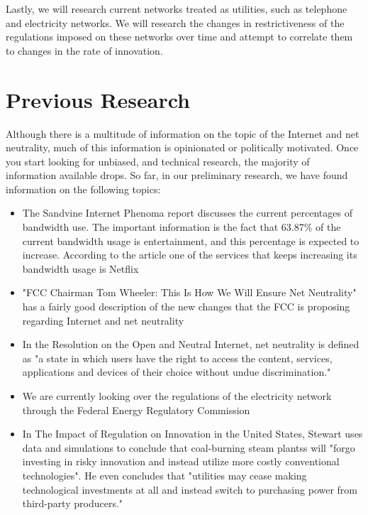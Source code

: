 \documentclass{sigcomm-alternate}
\begin{document}
Lastly, we will research current networks treated as utilities, such as telephone and electricity networks. We will research the changes in restrictiveness of the regulations imposed on these networks over time and attempt to correlate them to changes in the rate of innovation.


\section{Previous Research}
Although there is a multitude of information on the topic of the Internet and net neutrality, much of this information is opinionated or politically motivated. Once you start looking for unbiased, and technical research, the majority of information available drops. So far, in our preliminary research, we have found information on the following topics: 

\begin{itemize}
	\item The Sandvine Internet Phenoma report discusses the current percentages of bandwidth use. The important information is the fact that 63.87\% of the current bandwidth usage is entertainment, and this percentage is expected to increase. According to the article one of the services that keeps increasing its bandwidth usage is Netflix\cite{Sandvine}

	\item "FCC Chairman Tom Wheeler: This Is How We Will Ensure Net Neutrality" has a fairly good description of the new changes that the FCC is proposing regarding Internet and net neutrality\cite{FCCTomWheeler}
	
	\item In the Resolution on the Open and Neutral Internet, net neutrality is defined as "a state in which users have the right to access the content, services, applications and devices of their choice without undue discrimination."\cite{ResolutionOnOpenInternet}
	
	\item We are currently looking over the regulations of the electricity network through the Federal Energy Regulatory Commission \cite{FERC}
	
	
	\item In The Impact of Regulation on Innovation in the United States, Stewart uses data and simulations to conclude that coal-burning steam plantss will "forgo investing in risky innovation and instead utilize more costly conventional technologies"\cite{RegulationOnInnovation}. He even concludes that "utilities may cease making technological investments at all and instead switch to purchasing power from third-party producers."\cite{RegulationOnInnovation}
\end{itemize}
\end{document}
